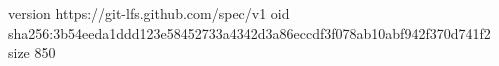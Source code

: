 version https://git-lfs.github.com/spec/v1
oid sha256:3b54eeda1ddd123e58452733a4342d3a86eccdf3f078ab10abf942f370d741f2
size 850
